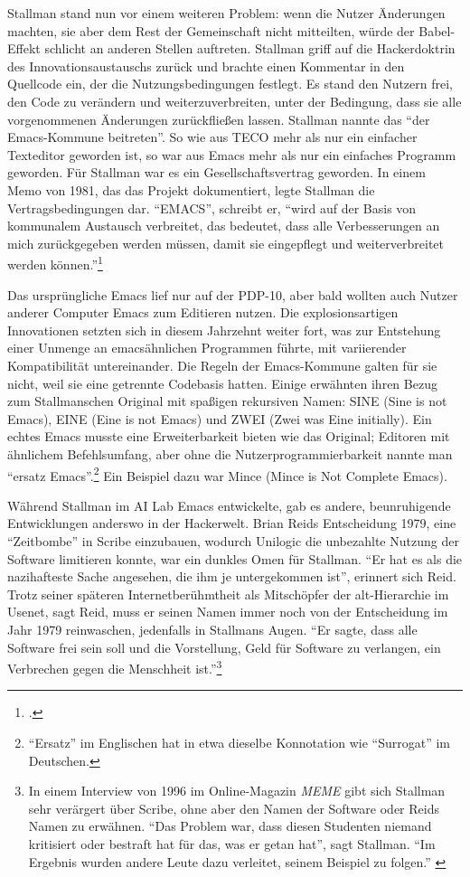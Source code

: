 Stallman stand nun vor einem weiteren Problem: wenn die Nutzer Änderungen machten, sie aber dem Rest der Gemeinschaft nicht mitteilten, würde der Babel-Effekt schlicht an anderen Stellen auftreten. Stallman griff auf die Hackerdoktrin des Innovationsaustauschs zurück und brachte einen Kommentar in den Quellcode ein, der die Nutzungsbedingungen festlegt. Es stand den Nutzern frei, den Code zu verändern und weiterzuverbreiten, unter der Bedingung, dass sie alle vorgenommenen Änderungen zurückfließen lassen. Stallman nannte das "`der Emacs-Kommune beitreten"'. So wie aus TECO mehr als nur ein einfacher Texteditor geworden ist, so war aus Emacs mehr als nur ein einfaches Programm geworden. Für Stallman war es ein Gesellschaftsvertrag geworden. In einem Memo von 1981, das das Projekt dokumentiert, legte Stallman die Vertragsbedingungen dar. "`EMACS"', schreibt er, "`wird auf der Basis von kommunalem Austausch verbreitet, das bedeutet, dass alle Verbesserungen an mich zurückgegeben werden müssen, damit sie eingepflegt und weiterverbreitet werden können."'\footcite[Vgl.][\href{http://www.gnu.org/software/emacs/emacs-paper.html\#SEC34}{\#SEC34}]{emacspaper}

Das ursprüngliche Emacs lief nur auf der PDP-10, aber bald wollten auch Nutzer anderer Computer Emacs zum Editieren nutzen. Die explosionsartigen Innovationen setzten sich in diesem Jahrzehnt weiter fort, was zur Entstehung einer Unmenge an emacsähnlichen Programmen führte, mit variierender Kompatibilität untereinander. Die Regeln der Emacs-Kommune galten für sie nicht, weil sie eine getrennte Codebasis hatten. Einige erwähnten ihren Bezug zum Stallmanschen Original mit spaßigen rekursiven Namen: SINE (Sine is not Emacs), EINE (Eine is not Emacs) und ZWEI (Zwei was Eine initially). Ein echtes Emacs musste eine Erweiterbarkeit bieten wie das Original; Editoren mit ähnlichem Befehlsumfang, aber ohne die Nutzerprogrammierbarkeit nannte man "`ersatz Emacs"'.\footnote{"`Ersatz"' im Englischen hat in etwa dieselbe Konnotation wie "`Surrogat"' im Deutschen.} Ein Beispiel dazu war Mince (Mince is Not Complete Emacs). 

Während Stallman im AI Lab Emacs entwickelte, gab es andere, beunruhigende Entwicklungen anderswo in der Hackerwelt. Brian Reids Entscheidung 1979, eine "`Zeitbombe"' in Scribe einzubauen, wodurch Unilogic die unbezahlte Nutzung der Software limitieren konnte, war ein dunkles Omen für Stallman. "`Er hat es als die nazihafteste Sache angesehen, die ihm je untergekommen ist"', erinnert sich Reid. Trotz seiner späteren Internetberühmtheit als Mitschöpfer der alt-Hierarchie im Usenet, sagt Reid, muss er seinen Namen immer noch von der Entscheidung im Jahr 1979 reinwaschen, jedenfalls in Stallmans Augen. "`Er sagte, dass alle Software frei sein soll und die Vorstellung, Geld für Software zu verlangen, ein Verbrechen gegen die Menschheit ist."'\footnote{In einem Interview von 1996 im Online-Magazin \textit{MEME} gibt sich Stallman sehr verärgert über Scribe, ohne aber den Namen der Software oder Reids Namen zu erwähnen. "`Das Problem war, dass diesen Studenten niemand kritisiert oder bestraft hat für das, was er getan hat"', sagt Stallman. "`Im Ergebnis wurden andere Leute dazu verleitet, seinem Beispiel zu folgen."' \cite[Vgl.][]{memeint}}


